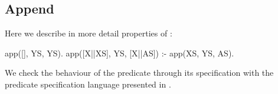 





\subsection{Append}
Here we describe in more detail properties of  :
%
\begin{yapcode}
 app([], YS, YS).
 app([X||XS], YS, [X||AS]) :- app(XS, YS, AS).
\end{yapcode}
%
We check the behaviour of the predicate through its specification with
the predicate specification language presented in
.
%


